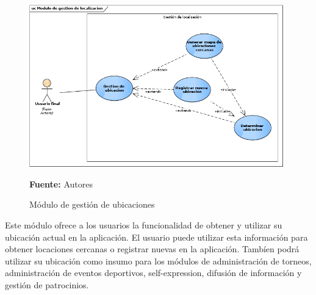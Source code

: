 \begin{figure}[!htb]
  \begin{center}
    \includegraphics[width=11cm]{./imagenes/casos_uso/gestion_localizacion.png}
    \caption{Módulo de gestión de ubicaciones}
    \label{fig:cu_localizacion}
    \textbf{Fuente:} Autores \\
  \end{center}
\end{figure}

Este módulo ofrece a los usuarios la funcionalidad de obtener y utilizar su ubicación actual en la aplicación. El usuario puede utilizar esta información para obtener locaciones cercanas o registrar nuevas en la aplicación. Tambíen podrá utilizar su ubicación como insumo para los módulos de administración de torneos, administración de eventos deportivos, self-expression, difusión de información y gestión de patrocinios.